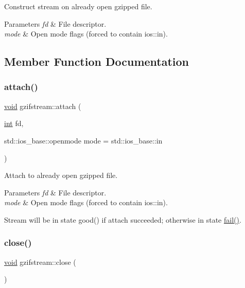 Construct stream on already open gzipped file. 


\begin{DoxyParams}{Parameters}
{\em fd} & File descriptor. \\
\hline
{\em mode} & Open mode flags (forced to contain ios\+::in). \\
\hline
\end{DoxyParams}


\subsection{Member Function Documentation}
\mbox{\label{classgzifstream_a24aff901c395acbdaddb7878f4ddb7aa}} 
\subsubsection{\texorpdfstring{attach()}{attach()}}
{\footnotesize\ttfamily \hyperlink{lp__lib_8h_ac7828c7b2b31d2e11af17bdb6289c5d9}{void} gzifstream\+::attach (\begin{DoxyParamCaption}\item[{\hyperlink{lp__lib_8h_adeb9ec6400320e4923ac9d836d509ddb}{int}}]{fd,  }\item[{std\+::ios\+\_\+base\+::openmode}]{mode = {\ttfamily std\+:\+:ios\+\_\+base\+:\+:in} }\end{DoxyParamCaption})}



Attach to already open gzipped file. 


\begin{DoxyParams}{Parameters}
{\em fd} & File descriptor. \\
\hline
{\em mode} & Open mode flags (forced to contain ios\+::in).\\
\hline
\end{DoxyParams}
Stream will be in state good() if attach succeeded; otherwise in state \hyperlink{_constraint_macros_8h_a73a3b169ac8c3419cbe15327e75ffcfd}{fail()}. \mbox{\label{classgzifstream_a073fadd9dc90195c47a6ae2d863c8ace}} 
\subsubsection{\texorpdfstring{close()}{close()}}
{\footnotesize\ttfamily \hyperlink{lp__lib_8h_ac7828c7b2b31d2e11af17bdb6289c5d9}{void} gzifstream\+::close (\begin{DoxyParamCaption}{ }\end{DoxyParamCaption})}



